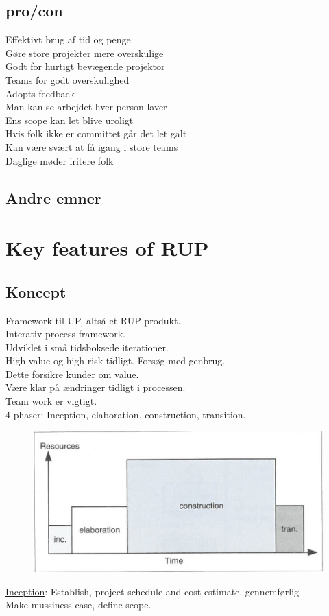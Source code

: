 \documentclass[11pt,a4paper]{article}
\begin{document}
\subsection{pro/con}
Effektivt brug af tid og penge\\
Gøre store projekter mere overskulige\\
Godt for hurtigt bevægende projektor\\
Teams for godt overskulighed\\
Adopts feedback\\
Man kan se arbejdet hver person laver\\
Ens scope kan let blive uroligt\\
Hvis folk ikke er committet går det let galt\\
Kan være svært at få igang i store teams\\
Daglige møder iritere folk\\
\subsection{Andre emner}
\newpage
\section{Key features of RUP}
\subsection{Koncept}
Framework til UP, altså et RUP produkt.\\
Interativ process framework.\\

Udviklet i små tidsboksede iterationer.\\
High-value og high-risk tidligt. Forsøg med genbrug.\\
Dette forsikre kunder om value.\\
Være klar på ændringer tidligt i processen.\\
Team work er vigtigt.\\
4 phaser: Inception, elaboration, construction, transition.

\begin{figure}[h!]
\includegraphics[scale=1]{rup.png}
\end{figure}
\underline{Inception}: Establish, project schedule and cost estimate, gennemførlig\\
Make mussiness case, define scope.
 
\end{document}
